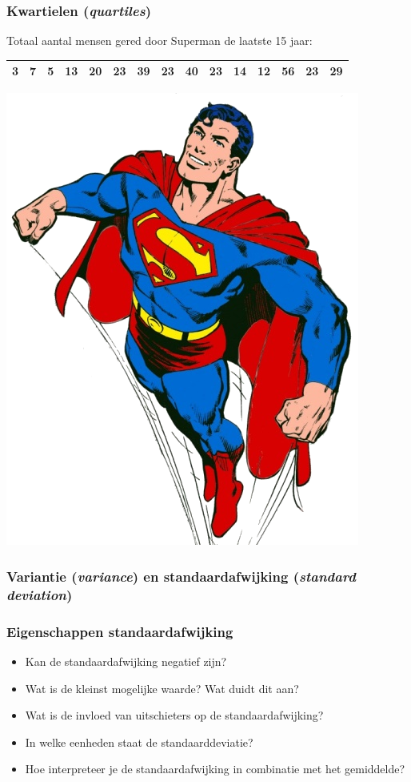 \documentclass{beamer}
\begin{document}
\begin{frame}
  \frametitle{Kwartielen (\emph{quartiles})}


  \vspace{1cm}

  Totaal aantal mensen gered door Superman de laatste 15 jaar:
   \begin{center}
    \begin{tabular}{|c|c|c|c|c|c|c|c|c|c|c|c|c|c|c|}
      \hline
      3&7&5&13&20&23&39&23&40&23&14&12&56&23&29\\
      \hline
    \end{tabular}
    \includegraphics[width=.7cm]{img/les2-hero-3}
  \end{center}

\end{frame}

\begin{frame}
  \frametitle{Variantie (\emph{variance}) en standaardafwijking (\emph{standard deviation})}


  \vspace{1em}

  
\end{frame}

\begin{frame}
  \frametitle{Eigenschappen standaardafwijking}

  \begin{itemize}
    \item<+-> Kan de standaardafwijking negatief zijn?
    \item<+-> Wat is de kleinst mogelijke waarde? Wat duidt dit aan?
    \item<+-> Wat is de invloed van uitschieters op de standaardafwijking?
    \item<+-> In welke eenheden staat de standaarddeviatie?
    \item<+-> Hoe interpreteer je de standaardafwijking in combinatie met het gemiddelde?
  \end{itemize}
\end{frame}
\end{document}
